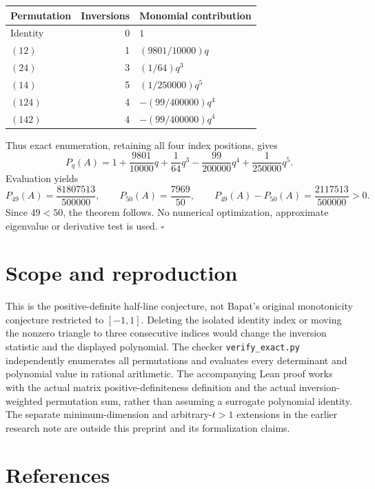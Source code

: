 \documentclass[11pt]{article}
\begin{document}
\begin{longtable}[]{@{}lrl@{}}
\toprule\noalign{}
Permutation & Inversions & Monomial contribution \\
\midrule\noalign{}
\endhead
\bottomrule\noalign{}
\endlastfoot
Identity & 0 & \(1\) \\
\((12)\) & 1 & \((9801/10000)q\) \\
\((24)\) & 3 & \((1/64)q^3\) \\
\((14)\) & 5 & \((1/250000)q^5\) \\
\((124)\) & 4 & \(-(99/400000)q^4\) \\
\((142)\) & 4 & \(-(99/400000)q^4\) \\
\end{longtable}

Thus exact enumeration, retaining all four index positions, gives \[
P_q(A)=1+\frac{9801}{10000}q+\frac1{64}q^3
                -\frac{99}{200000}q^4+\frac1{250000}q^5.
\] Evaluation yields \[
P_{49}(A)=\frac{81807513}{500000},\qquad
P_{50}(A)=\frac{7969}{50},\qquad
P_{49}(A)-P_{50}(A)=\frac{2117513}{500000}>0.
\] Since \(49<50\), the theorem follows. No numerical optimization,
approximate eigenvalue or derivative test is used. \(\square\)

\section{Scope and reproduction}\label{scope-and-reproduction}

This is the positive-definite half-line conjecture, not Bapat's original
monotonicity conjecture restricted to \([-1,1]\). Deleting the isolated
identity index or moving the nonzero triangle to three consecutive
indices would change the inversion statistic and the displayed
polynomial. The checker \texttt{verify\_exact.py} independently
enumerates all permutations and evaluates every determinant and
polynomial value in rational arithmetic. The accompanying Lean proof
works with the actual matrix positive-definiteness definition and the
actual inversion-weighted permutation sum, rather than assuming a
surrogate polynomial identity. The separate minimum-dimension and
arbitrary-\(t>1\) extensions in the earlier research note are outside
this preprint and its formalization claims.

\section{References}\label{references}
\end{document}
